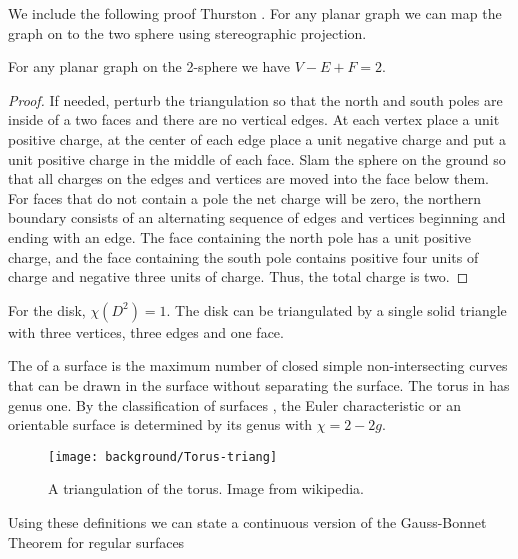We include the following proof Thurston \cite{thurston}. 
For any planar graph we can map the graph on to the two sphere using stereographic projection.
 

\begin{theorem}\label{thm:euler}
For any planar graph on the 2-sphere we have $V-E+F=2.$
\end{theorem}

\begin{proof}
If needed, perturb the triangulation so that the north and south poles are 
inside of a two faces and there are no vertical edges. At each vertex place a unit positive
charge, at the center of each edge place a unit negative charge and put a unit positive
charge in the middle of each face. Slam the sphere on the ground so that all charges
on the edges and vertices are moved into the face below them. For faces that do not contain a pole
the net charge will be zero, the northern boundary consists of an alternating sequence
of edges and vertices  beginning  and ending with an edge.
The face containing the north pole has a unit positive charge, and the face containing the south
pole contains positive four units of charge and negative three units of charge.
Thus, the total charge is two.

\end{proof}


For the disk, $\chi(D^2)=1$. The disk can be triangulated by
a single solid triangle with three vertices, three edges and one face.

The  of a surface is the maximum number of closed simple
non-intersecting curves that can be drawn in the surface without separating
the surface.
The torus in  has genus one.
By the classification of surfaces \cite{munkres}, the Euler characteristic or an orientable surface
is determined by its genus with $\chi=2-2g$.



\begin{figure}[htb]
\centering
\texttt{[image: background/Torus-triang]}
\caption{A triangulation of the torus. Image from wikipedia.}
\label{fig:triangulated-torus}
\end{figure}



Using these definitions we can state a continuous version of
the Gauss-Bonnet Theorem for regular surfaces

